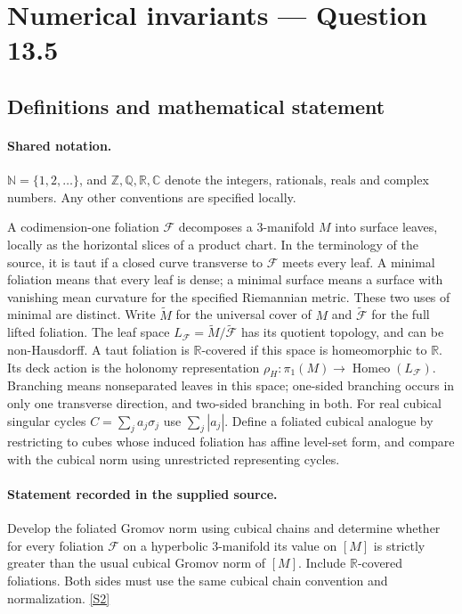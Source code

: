 \documentclass[11pt]{article}
\newcommand{\sref}[2]{\hyperlink{source:#1:#2}{[S#2]}}
\begin{document}
\section{Numerical invariants — Question 13.5}\label{statement}

\subsection{Definitions and mathematical statement}

\paragraph{Shared notation.}$\mathbb N=\{1,2,\ldots\}$, and $\mathbb Z,\mathbb Q,\mathbb R,\mathbb C$ denote the integers, rationals, reals and complex numbers. Any other conventions are specified locally.


A codimension-one foliation $\mathcal F$ decomposes a $3$-manifold $M$ into surface leaves, locally as the horizontal slices of a product chart. In the terminology of the source, it is taut if a closed curve transverse to $\mathcal F$ meets every leaf. A minimal foliation means that every leaf is dense; a minimal surface means a surface with vanishing mean curvature for the specified Riemannian metric. These two uses of minimal are distinct. Write $\widetilde M$ for the universal cover of $M$ and $\widetilde{\mathcal F}$ for the full lifted foliation. The leaf space $L_{\mathcal F}=\widetilde M/\widetilde{\mathcal F}$ has its quotient topology, and can be non-Hausdorff. A taut foliation is $\mathbb R$-covered if this space is homeomorphic to $\mathbb R$. Its deck action is the holonomy representation $\rho_H:\pi_1(M)\longrightarrow\operatorname{Homeo}(L_{\mathcal F})$. Branching means nonseparated leaves in this space; one-sided branching occurs in only one transverse direction, and two-sided branching in both. For real cubical singular cycles $C=\sum_j a_j\sigma_j$ use $\sum_j|a_j|$. Define a foliated cubical analogue by restricting to cubes whose induced foliation has affine level-set form, and compare with the cubical norm using unrestricted representing cycles.
\paragraph{Statement recorded in the supplied source.}
Develop the foliated Gromov norm using cubical chains and determine whether for every foliation $\mathcal F$ on a hyperbolic $3$-manifold its value on $[M]$ is strictly greater than the usual cubical Gromov norm of $[M]$. Include $\mathbb R$-covered foliations. Both sides must use the same cubical chain convention and normalization. \sref{statement}{2}
\end{document}
